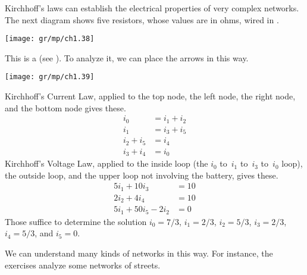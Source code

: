 Kirchhoff's laws can 
establish the electrical properties of very complex networks.
The next diagram shows
five resistors, whose values are in ohms, wired in 
. 
\begin{center}
  \texttt{[image: gr/mp/ch1.38]}
\end{center}
This is a  
(see ).
To analyze it, we can place the arrows in this way.
\begin{center}
  \texttt{[image: gr/mp/ch1.39]}
\end{center}
Kirchhoff's Current Law, applied to the
top node, the left node, the right node, and the bottom node gives
these.
\begin{align*}
   i_0     &=  i_1+i_2  \\
   i_1     &=  i_3+i_5  \\
   i_2+i_5 &=  i_4      \\
   i_3+i_4 &=  i_0
\end{align*} 
Kirchhoff's Voltage Law,
applied to the inside loop (the $i_0$ to~$i_1$ to~$i_3$ to~$i_0$ loop), 
the outside loop, 
and the upper loop not involving the battery, gives these.  
\begin{align*}
      5i_1+10i_3  &= 10   \\
      2i_2+4i_4   &= 10   \\
      5i_1+50i_5-2i_2  &= 0     
\end{align*} 
Those suffice to determine the solution 
$i_0=7/3$, $i_1=2/3$, $i_2=5/3$, 
$i_3=2/3$, $i_4=5/3$, and $i_5=0$. 

We can understand many kinds of networks in this way.
For instance, the exercises analyze some networks of streets.
 
